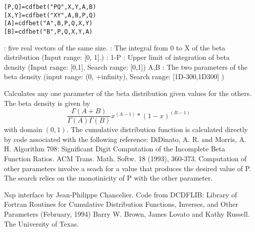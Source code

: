 \begin{mandesc}
\end{mandesc}
\label{cdfbet}
\begin{calling_sequence}
\begin{verbatim}
[P,Q]=cdfbet("PQ",X,Y,A,B)  
[X,Y]=cdfbet("XY",A,B,P,Q)  
[A]=cdfbet("A",B,P,Q,X,Y)  
[B]=cdfbet("B",P,Q,X,Y,A)  
\end{verbatim}
\end{calling_sequence}
\begin{parameters}
  \begin{varlist}
     : five real vectors of the same size.
     : The integral from 0 to X of the beta distribution (Input range: [0, 1].)
     : 1-P
     : Upper limit of integration of beta density (Input range: [0,1],  Search range: [0,1]) A,B : The two parameters of the beta density (input range: (0, +infinity), Search range: [1D-300,1D300] )
  \end{varlist}
\end{parameters}
\begin{mandescription}
  Calculates any one parameter of the beta distribution given
  values for the others. The beta density is given by
  \begin{equation}
    \frac{\Gamma(A+B)}{\Gamma(A)\Gamma(B)} x^{(A-1)} * (1-x)^{(B-1)}
  \end{equation}
  with domain $(0,1)$.
  The cumulative distribution function is calculated directly by
  code associated with the following reference: 
  DiDinato, A. R. and Morris,  A.   H.  Algorithm 708: Significant
  Digit Computation of the Incomplete  Beta  Function Ratios.  ACM
  Trans. Math.  Softw. 18 (1993), 360-373.
  Computation of other parameters involve a seach for a value that
  produces  the desired  value  of P.   The search relies  on  the
  monotinicity of P with the other parameter.
\end{mandescription}

\begin{program}
\end{program}

\begin{authors}
  Nsp interface by Jean-Philippe Chancelier. Code from DCDFLIB: 
  Library of Fortran Routines for Cumulative Distribution
  Functions, Inverses, and Other Parameters (February, 1994)
  Barry W. Brown, James Lovato and Kathy Russell. The University of Texas.
\end{authors}

